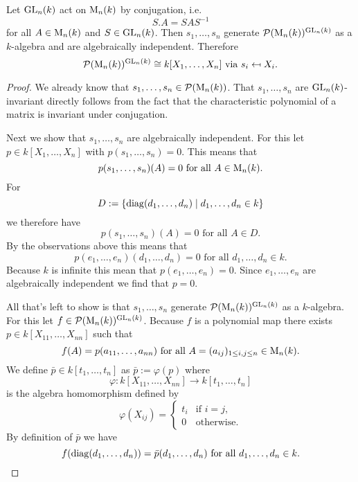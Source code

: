 \begin{thrm}
 Let $\operatorname{GL}_n(k)$ act on $\operatorname{M}_n(k)$ by conjugation, i.e.
 \[
  S.A = SAS^{-1}
 \]
 for all $A \in \operatorname{M}_n(k)$ and $S \in \operatorname{GL}_n(k)$. Then $s_1, \dotsc, s_n$ generate $\mathcal{P}(\operatorname{M}_n(k))^{\operatorname{GL}_n(k)}$ as a $k$-algebra and are algebraically independent. Therefore
 \[
  \mathcal{P}(\operatorname{M}_n(k))^{\operatorname{GL}_n(k)} \cong k[X_1, \dotsc, X_n] \text{ via } s_i \mapsfrom X_i.
 \]
\end{thrm}
\begin{proof}
 We already know that $s_1, \dotsc, s_n \in \mathcal{P}(\operatorname{M}_n(k))$. That $s_1, \dotsc, s_n$ are $\operatorname{GL}_n(k)$-invariant directly follows from the fact that the characteristic polynomial of a matrix is invariant under conjugation.
 
 Next we show that $s_1, \dotsc, s_n$ are algebraically independent. For this let $p \in k[X_1, \dotsc, X_n]$ with $p(s_1, \dotsc, s_n) = 0$. This means that
 \[
  p(s_1, \dotsc, s_n)(A) = 0 \text{ for all } A \in \operatorname{M}_n(k).
 \]
 For
 \[
  D := \{\operatorname{diag}(d_1, \dotsc, d_n) \mid d_1, \dotsc, d_n \in k\}
 \]
 we therefore have
 \[
  p(s_1, \dotsc, s_n)(A) = 0 \text{ for all } A \in D.
 \]
 By the observations above this means that 
 \[
  p(e_1, \dotsc, e_n)(d_1, \dotsc, d_n) = 0 \text{ for all } d_1, \dotsc, d_n \in k.
 \]
 Because $k$ is infinite this mean that $p(e_1, \dotsc, e_n) = 0$. Since $e_1, \dotsc, e_n$ are algebraically independent we find that $p =0$.
 
 All that’s left to show is that $s_1, \dotsc, s_n$ generate $\mathcal{P}(\operatorname{M}_n(k))^{\operatorname{GL}_n(k)}$ as a $k$-algebra. For this let $f \in \mathcal{P}(\operatorname{M}_n(k))^{\operatorname{GL}_n(k)}$. Because $f$ is a polynomial map there exists $p \in k[X_{11}, \dotsc, X_{nn}]$ such that
 \[
  f(A) = p(a_{11}, \dotsc, a_{nn}) \text{ for all } A = (a_{ij})_{1 \leq i,j \leq n} \in \operatorname{M}_n(k).
 \]
 We define $\bar{p} \in k[t_1, \dotsc, t_n]$ as $\bar{p} := \varphi(p)$ where
 \[
  \varphi \colon k[X_{11}, \dotsc, X_{nn}] \to k[t_1, \dotsc, t_n]
 \]
 is the algebra homomorphism defined by
 \[
  \varphi(X_{ij}) =
  \begin{cases}
   t_i & \text{if } i = j, \\
     0 & \text{otherwise}.
  \end{cases}
 \]
 By definition of $\bar{p}$ we have
 \[
  f(\operatorname{diag}(d_1, \dotsc, d_n)) = \bar{p}(d_1, \dotsc, d_n) \text{ for all } d_1, \dotsc, d_n \in k.
 \]
 

\end{proof}
